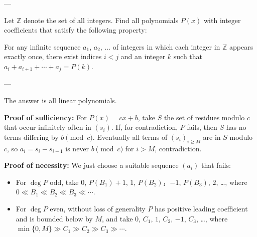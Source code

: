 
---

Let $\mathbb Z$ denote the set of all integers. Find all polynomials $P(x)$ with integer coefficients that satisfy the following property:

For any infinite sequence $a_1$, $a_2$, $\ldots$ of integers in which each integer in $\mathbb Z$ appears exactly once, there exist indices $i<j$ and an integer $k$ such that $a_i+a_{i+1}+\cdots+a_j=P(k)$.

---

The answer is all linear polynomials.

\bigskip

\textbf{Proof of sufficiency:} For $P(x)=cx+b$, take $S$ the set of residues modulo $c$ that occur infinitely often in $(s_i)$. If, for contradiction, $P$ fails, then $S$ has no terms differing by $b\pmod c$. Eventually all terms of $(s_i)_{i\ge M}$ are in $S$ modulo $c$, so $a_i=s_i-s_{i-1}$ is never $b\pmod c$ for $i>M$, contradiction.

\bigskip

\textbf{Proof of necessity:} We just choose a suitable sequence $(a_i)$ that fails:
\begin{itemize}
    \item For $\deg P$ odd, take
        $0$, $P(B_1)+1$, $1$, $P(B_2)$，$-1$, $P(B_3)$, $2$, \ldots, where $0\ll B_1\ll B_2\ll B_3\ll\cdots$.
    \item For $\deg P$ even, without loss of generality $P$ has positive leading coefficient and is bounded below by $M$, and take
        $0$, $C_1$, $1$, $C_2$, $-1$, $C_3$, \ldots, where $\min\{0,M\}\gg C_1\gg C_2\gg C_3\gg\cdots$.
\end{itemize}

